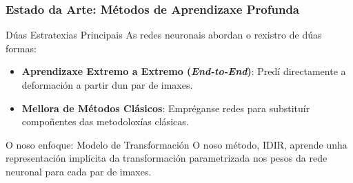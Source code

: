 \documentclass[xcolor=dvipsnames]{beamer}
\begin{document}
\begin{frame}
\frametitle{Estado da Arte: Métodos de Aprendizaxe Profunda}

\begin{block}{Dúas Estratexias Principais}
    As redes neuronais abordan o rexistro de dúas formas:
    \begin{itemize}
        \item \textbf{Aprendizaxe Extremo a Extremo (\textit{End-to-End})}: Predí directamente a deformación a partir dun par de imaxes.
        \item \textbf{Mellora de Métodos Clásicos}: Empréganse redes para substituír compoñentes das metodoloxías clásicas.
    \end{itemize}
\end{block}
    
\begin{alertblock}{O noso enfoque: Modelo de Transformación}
    O noso método, IDIR, aprende unha representación implícita da transformación parametrizada nos pesos da rede neuronal para cada par de imaxes.
\end{alertblock}


\end{frame}
\end{document}
